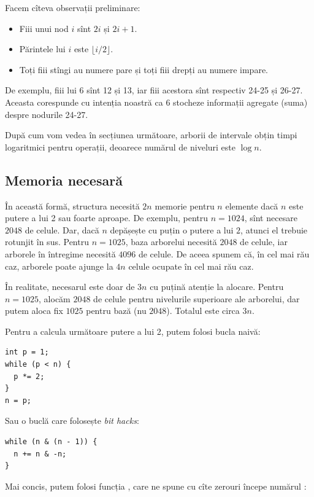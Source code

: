 \documentclass[../main.tex]{subfiles}
\begin{document}
Facem cîteva observații preliminare:

\begin{itemize}
  \item Fiii unui nod $i$ sînt $2i$ și $2i + 1$.
  \item Părintele lui $i$ este $\lfloor i / 2 \rfloor$.
  \item Toți fiii stîngi au numere pare și toți fiii drepți au numere impare.
\end{itemize}

De exemplu, fiii lui 6 sînt 12 și 13, iar fiii acestora sînt respectiv 24-25 și 26-27. Aceasta corespunde cu intenția noastră ca 6 stocheze informații agregate (suma) despre nodurile 24-27.

După cum vom vedea în secțiunea următoare, arborii de intervale obțin timpi logaritmici pentru operații, deoarece numărul de niveluri este $\log n$.

\subsection{Memoria necesară}

În această formă, structura necesită $2n$ memorie pentru $n$ elemente dacă $n$ este putere a lui 2 sau foarte aproape. De exemplu, pentru $n = 1024$, sînt necesare $2048$ de celule. Dar, dacă $n$ depășește cu puțin o putere a lui $2$, atunci el trebuie rotunjit în sus. Pentru $n = 1025$, baza arborelui necesită $2048$ de celule, iar arborele în întregime necesită $4096$ de celule. De aceea spunem că, în cel mai rău caz, arborele poate ajunge la $4n$ celule ocupate în cel mai rău caz.

În realitate, necesarul este doar de $3n$ cu puțină atenție la alocare. Pentru $n = 1025$, alocăm $2048$ de celule pentru nivelurile superioare ale arborelui, dar putem aloca fix $1025$ pentru bază (nu $2048$). Totalul este circa $3n$.

Pentru a calcula următoare putere a lui 2, putem folosi bucla naivă:

\begin{verbatim}
int p = 1;
while (p < n) {
  p *= 2;
}
n = p;
\end{verbatim}

Sau o buclă care folosește \textit{bit hacks}:

\begin{verbatim}
while (n & (n - 1)) {
  n += n & -n;
}
\end{verbatim}

Mai concis, putem folosi funcția , care ne spune cu cîte zerouri începe numărul :
\end{document}
